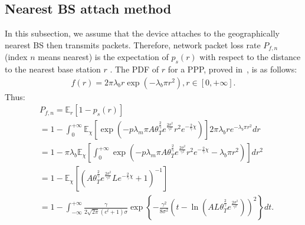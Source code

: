\subsection{Nearest BS attach method}
\label{sec:nearest_BS_attach_method}
In this subsection, we assume that the device attaches to the geographically nearest BS then transmits packets. 
Therefore, network packet loss rate $P_{f,n}$ (index $n$ means nearest) is the expectation of $p_s(r)$ with respect to the distance to the nearest base station $r$ . The PDF of $r$ for a PPP, proved in~\cite{andrews2011tractable}, is as follows:
\begin{align}
\label{eq:pdf_nearest_distance}
f\left( r\right)  = 2 \pi \lambda_b  r \exp(-\lambda_b \pi r^2), r \in \left[ 0, +\infty\right]. 
\end{align}
Thus:
\begin{align}
\label{eq:mean_bx+1_step1}
&P_{f,n}= \mathbb{E}_{r}\left[ 1-p_{s}\left(r\right) \right]  \nonumber\\
&= 1 -\int_{0}^{+\infty} \mathbb{E}_{\chi} \left[ \exp(-p \lambda_{m} \pi A \theta_{T}^{\frac{2}{\gamma}} e^{\frac{2\sigma^2}{\gamma^2}}  r^2 e^{-\frac{2}{\gamma}\chi}) \right] 2 \pi \lambda_b  r e^{-\lambda_b \pi r^2} dr \nonumber\\
&= 1-\pi \lambda_b \mathbb{E}_{\chi}\left[ \int_{0}^{+\infty} \exp(-p \lambda_{m} \pi A \theta_{T}^{\frac{2}{\gamma}} e^{\frac{2\sigma^2}{\gamma^2}}  r^2 e^{-\frac{2}{\gamma}\chi}-\lambda_b \pi r^2)\right] \!\!dr^2 \nonumber\\
&= 1 -\mathbb{E}_{\chi}\left[\left( A \theta_{T}^{\frac{2}{\gamma}} e^{\frac{2\sigma^2}{\gamma^2}} L  e^{-\frac{2}{\gamma}\chi}+1 \right)^{-1} \right] \nonumber\\
&= 1 - \int_{-\infty}^{+\infty} \!\!\! \frac{\gamma}{ 2\sqrt{2\pi}\left( e^t+1\right)\sigma} \exp \left\lbrace -\frac{\gamma^2}{8 \sigma^2} \left(    t-\ln(A L \theta_{T}^{\frac{2}{\gamma}} e^{\!\! \frac{2\sigma^2}{\gamma^2}} )   \right) ^2 \right\rbrace dt.  
\end{align}
